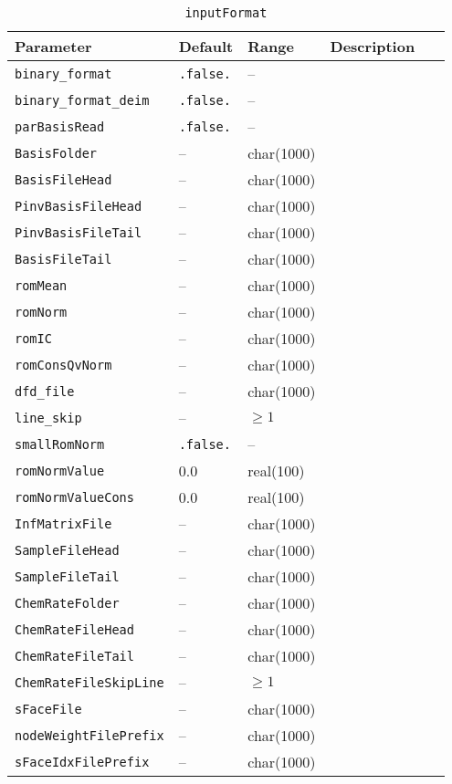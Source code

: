 \begin{table}[H]
    \centering
    \begin{tabular}{p{0.25\linewidth} p{0.1\linewidth} p{0.1\linewidth} p{0.5\linewidth}}
        \toprule
        Parameter & Default & Range & Description \\
        \midrule
        \verb|binary_format| & \verb|.false.| & -- &  \\
        \verb|binary_format_deim| & \verb|.false.| & -- &  \\
        \verb|parBasisRead| & \verb|.false.| & -- &  \\
        \verb|BasisFolder| & -- & char(1000) &  \\
        \verb|BasisFileHead| & -- & char(1000) &  \\
        \verb|PinvBasisFileHead| & -- & char(1000) &  \\
        \verb|PinvBasisFileTail| & -- & char(1000) &  \\
        \verb|BasisFileTail| & -- & char(1000) &  \\
        \verb|romMean| & -- & char(1000) &  \\
        \verb|romNorm| & -- & char(1000) &  \\
        \verb|romIC| & -- & char(1000) &  \\
        \verb|romConsQvNorm| & -- & char(1000) &  \\
        \verb|dfd_file| & -- & char(1000) &  \\
        \verb|line_skip| & -- & $\ge 1$ &  \\
        \verb|smallRomNorm| & \verb|.false.| & -- &  \\
        \verb|romNormValue| & 0.0 & real(100) &  \\
        \verb|romNormValueCons| & 0.0 & real(100) &  \\
        \verb|InfMatrixFile| & -- & char(1000) &  \\
        \verb|SampleFileHead| & -- & char(1000) &  \\
        \verb|SampleFileTail| & -- & char(1000) &  \\
        \verb|ChemRateFolder| & -- & char(1000) &  \\
        \verb|ChemRateFileHead| & -- & char(1000) &  \\
        \verb|ChemRateFileTail| & -- & char(1000) &  \\
        \verb|ChemRateFileSkipLine| & -- & $\ge 1$ &  \\
        \verb|sFaceFile| & -- & char(1000) &  \\
        \verb|nodeWeightFilePrefix| & -- & char(1000) &  \\
        \verb|sFaceIdxFilePrefix| & -- & char(1000) &  \\
        \bottomrule
    \end{tabular}
    \caption{\texttt{inputFormat}}
\end{table}

